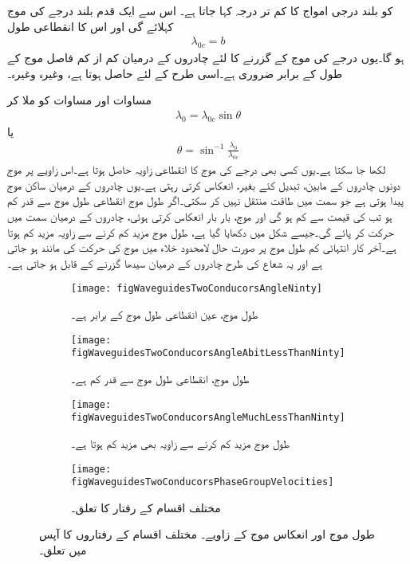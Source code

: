  کو بلند درجی  امواج کا کم تر درجہ کہا جاتا ہے۔ اس سے ایک قدم بلند  درجے کی موج کہلائے گی اور اس کا انقطاعی طول
\begin{align}
\lambda_{0c}=b
\end{align}
ہو گا۔یوں  درجے کی  موج کے گزرنے کا لئے چادروں کے درمیان کم از کم فاصل موج کے طول کے برابر ضروری ہے۔اسی طرح  کے لئے  حاصل ہوتا ہے، وغیرہ وغیرہ۔

مساوات  اور مساوات  کو ملا کر
\begin{align}
\lambda_0=\lambda_{0c} \sin \theta
\end{align}
یا
\begin{align}
\theta=\sin^{-1}\frac{\lambda_0}{\lambda_{0c}}
\end{align}
لکھا جا سکتا ہے۔یوں کسی بھی درجے کی موج کا انقطاعی زاویہ  حاصل ہوتا ہے۔اس زاویے پر موج  دونوں چادروں کے مابین،  تبدیل کئے بغیر،  انعکاس کرتی رہتی ہے۔یوں چادروں کے درمیان ساکن موج پیدا ہوتی ہے جو  سمت میں طاقت منتقل نہیں کر سکتی۔اگر طول موج  انقطاعی طول موج  سے قدر کم ہو تب  کی قیمت  سے کم ہو گی اور موج، بار بار انعکاس کرتی ہوئی، چادروں کے درمیان  سمت میں حرکت کر پائے گی۔جیسے شکل  میں دکھایا گیا ہے، طول موج مزید کم کرنے سے زاویہ مزید کم ہوتا ہے۔آخر کار انتہائی کم طول موج پر صورت حال لامحدود خلاء میں موج کی حرکت کی مانند ہو جاتی ہے اور یہ شعاع کی طرح چادروں کے درمیان سیدھا گزرنے کے قابل ہو جاتی ہے۔

\begin{figure}
\centering
\begin{subfigure}{0.5\textwidth}
\centering
\texttt{[image: figWaveguidesTwoConducorsAngleNinty]}
\caption{طول موج، عین انقطاعی طول موج کے برابر ہے۔}
\end{subfigure}%
%
\begin{subfigure}{0.5\textwidth}
\centering
\texttt{[image: figWaveguidesTwoConducorsAngleAbitLessThanNinty]}
\caption{طول موج، انقطاعی طول موج سے قدر کم ہے۔}
\end{subfigure}%

\begin{subfigure}{0.4\textwidth}
\centering
\texttt{[image: figWaveguidesTwoConducorsAngleMuchLessThanNinty]}
\caption{طول موج مزید کم کرنے سے زاویہ بھی مزید کم ہوتا ہے۔}
\end{subfigure}%
\begin{subfigure}{0.4\textwidth}
\centering
\texttt{[image: figWaveguidesTwoConducorsPhaseGroupVelocities]}
\caption{مختلف اقسام کے رفتار کا تعلق۔}
\end{subfigure}%
\caption{طول موج اور انعکاس موج کے زاویے۔ مختلف اقسام کے رفتاروں کا آپس میں تعلق۔}
\label{شکل_مویج_طول_موج_اور_زاویہ_انعاکس}
\end{figure}

